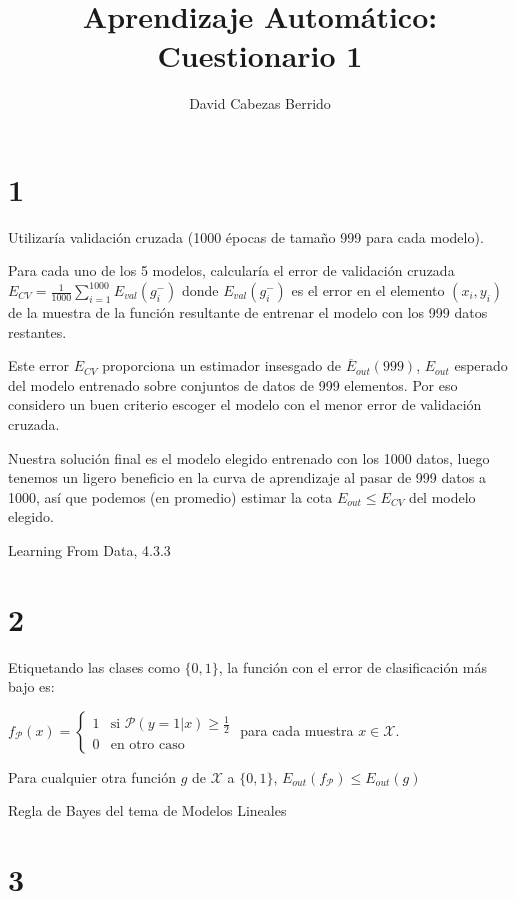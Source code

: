 \documentclass{article}
\begin{document}
\title{Aprendizaje Automático: Cuestionario 1}
\author{David Cabezas Berrido}
\maketitle

\section{1}

Utilizaría validación cruzada (1000 épocas de tamaño 999 para cada
modelo).

Para cada uno de los 5 modelos, calcularía el error de validación
cruzada \( E_{CV}
=\frac{1}{1000}\sum\limits_{i=1}^{1000}E_{val}(g_i^-) \) donde \(
E_{val}(g_i^-) \) es el error en el elemento \( (x_i,y_i) \) de la
muestra de la función resultante de entrenar el modelo con los 999
datos restantes.

Este error \( E_{CV} \) proporciona un estimador insesgado de \(
\overline{E}_{out}(999) \), \(E_{out}\) esperado del modelo entrenado
sobre conjuntos de datos de 999 elementos.  Por eso considero un buen
criterio escoger el modelo con el menor error de validación cruzada.

Nuestra solución final es el modelo elegido entrenado con los 1000
datos, luego tenemos un ligero beneficio en la curva de aprendizaje al
pasar de 999 datos a 1000, así que podemos (en promedio) estimar la cota
\( E_{out}\leq E_{CV} \) del modelo elegido.


Learning From Data, 4.3.3

\section{2}

Etiquetando las clases como \( \{0,1\} \), la función con el error de clasificación más bajo es:

\( f_{\mathcal{P}}(x) = \begin{cases} 1 &\mbox{si } \mathcal{P}(y=1|x)\geq \frac{1}{2} \\ 0 &\mbox{en otro caso}\end{cases} \)
para cada muestra \(x\in\mathcal{X}\).

Para cualquier otra función \(g\) de \(\mathcal{X}\) a \( \{0,1\} \), \( E_{out}(f_{\mathcal{P}})\leq E_{out}(g) \)


Regla de Bayes del tema de Modelos Lineales

\section{3}
\end{document}
